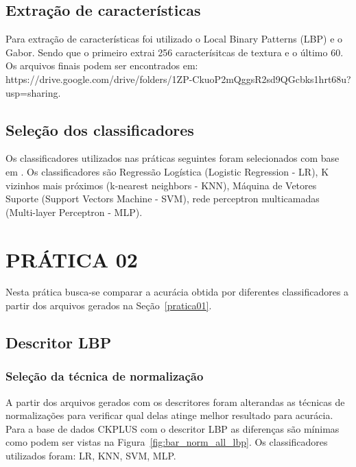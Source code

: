 \documentclass[a4paper, 12 pt, conference]{ieeeconf}  %
\begin{document}
\subsection{Extração de características}
Para extração de características foi utilizado o Local Binary Patterns (LBP) e o Gabor. Sendo que o primeiro extrai 256 caracterísitcas de textura e o último 60. Os arquivos finais podem ser encontrados em: https://drive.google.com/drive/folders/1ZP-CkuoP2mQggsR2sd9QGcbks1hrt68u?usp=sharing.

\subsection{Seleção dos classificadores}
Os classificadores utilizados nas práticas seguintes foram selecionados com base em \cite{rajan:19}. Os classificadores são Regressão Logística (Logistic Regression - LR), K vizinhos mais próximos (k-nearest neighbors - KNN), Máquina de Vetores Suporte (Support Vectors Machine - SVM), rede perceptron multicamadas (Multi-layer Perceptron - MLP).

\section{PRÁTICA 02}
\label{pratica02}
Nesta prática busca-se comparar a acurácia obtida por diferentes classificadores a partir dos arquivos gerados na Seção~\ref{pratica01}.

\subsection{Descritor LBP}
\subsubsection{Seleção da técnica de normalização}
A partir dos arquivos gerados com os descritores foram alterandas as técnicas de normalizações para verificar qual delas atinge melhor resultado para acurácia. Para a base de dados CKPLUS com o descritor LBP as diferenças são mínimas como podem ser vistas na Figura~\ref{fig:bar_norm_all_lbp}. Os classificadores utilizados foram: LR, KNN, SVM, MLP.
\end{document}

